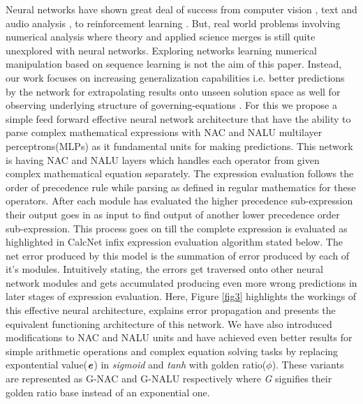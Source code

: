 \documentclass[conference]{IEEEtran}
\begin{document}
Neural networks have shown great deal of success from computer vision \cite{b6, b10}, text and audio analysis \cite{b7}, to reinforcement learning \cite{b8}. But, real world problems involving numerical analysis where theory and applied science merges is still quite unexplored with neural networks. Exploring networks learning numerical manipulation based on sequence learning is not the aim of this paper. Instead, our work focuses on increasing generalization capabilities i.e. better predictions by the network for extrapolating results onto unseen solution space as well for observing underlying structure of governing-equations \cite{b12}. For this we propose a simple feed forward effective neural network architecture that have the ability to parse complex mathematical expressions with NAC and NALU multilayer perceptrons(MLPs) as it fundamental units for making predictions. This network is having NAC and NALU layers which handles each operator from given complex mathematical equation separately.
The expression evaluation follows the order of precedence rule while parsing as defined in regular mathematics for these operators. After each module has evaluated the higher precedence sub-expression their output goes in as input to find output of another lower precedence order sub-expression. This process goes on till the complete expression is evaluated as highlighted in CalcNet infix expression evaluation algorithm stated below. The net error produced by this model is the summation of error produced by each of it's modules. Intuitively stating, the errors get traversed onto other neural network modules and gets accumulated producing even more wrong predictions in later stages of expression evaluation. Here, Figure \ref{fig3} highlights the workings of this effective neural architecture, explains error propagation and presents the equivalent functioning architecture of this network.
We have also introduced modifications to NAC and NALU units and have achieved even better results for simple arithmetic operations and complex equation solving tasks by replacing expontential value($\textbf{\textit{e}}$) in \textit{sigmoid} and \textit{tanh} with golden ratio($\phi$). These variants are represented as  G-NAC and G-NALU respectively where \textit{G} signifies their golden ratio base instead of an exponential one.  
\end{document}
